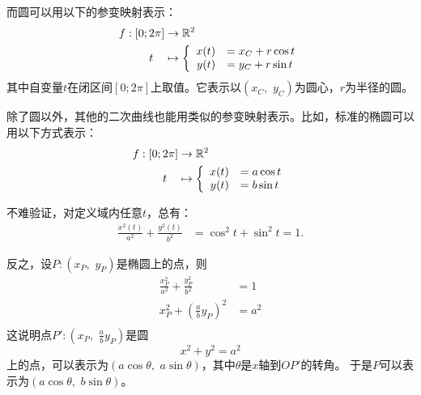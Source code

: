\documentclass[12pt,UTF8]{ctexbook}
\theoremstyle{definition}
\theoremstyle{plain}
\begin{document}
而圆可以用以下的参变映射表示：
\begin{align*}
    f: [0;2\pi] &\rightarrow \mathbb{R}^2 \\
    t\quad &\mapsto\left\{
        \begin{array}[]{rl}
            x(t) &= x_C + r\cos{t} \\
            y(t) &= y_C + r\sin{t} \\
        \end{array}
    \right.
\end{align*}
其中自变量$t$在闭区间$[0;2\pi]$上取值。它表示以$(x_C,\,\, y_C)$为圆心，$r$为半径的圆。

除了圆以外，其他的二次曲线也能用类似的参变映射表示。比如，标准的椭圆可以用以下方式表示：
\begin{align*}
    f: [0;2\pi] &\rightarrow \mathbb{R}^2 \\
    t\quad &\mapsto\left\{
        \begin{array}[]{rl}
            x(t) &= a\cos{t} \\
            y(t) &= b\sin{t} \\
        \end{array}
    \right.
\end{align*}

不难验证，对定义域内任意$t$，总有：
\begin{align*}
    \frac{x^2(t)}{a^2} + \frac{y^2(t)}{b^2} &= \cos^2{t} + \sin^2{t} = 1.
\end{align*}

反之，设$P:(x_P,\,\,y_P)$是椭圆上的点，则
\begin{align*}
    \frac{x_P^2}{a^2} + \frac{y_P^2}{b^2} &= 1\\
   x_P^2 + \left(\frac{a}{b}y_P\right)^2 & = a^2 \\
\end{align*}
这说明点$\displaystyle P': \left(x_P,\,\,\frac{a}{b}y_P\right)$是圆
$$ x^2 + y^2 = a^2$$
上的点，可以表示为$(a\cos{\theta},\,\,a\sin{\theta})$，其中$\theta$是$x$轴到$OP'$的转角。
于是$P$可以表示为$(a\cos{\theta},\,\,b\sin{\theta})$。
\end{document}
